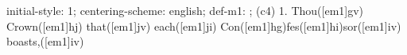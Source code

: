 initial-style: 1;
centering-scheme: english;
def-m1: \grealign;
(c4) 1. Thou([em1]gv) Crown([em1]hj) that([em1]jv) each([em1]ji) Con([em1]hg)fes([em1]hi)sor([em1]iv) boasts,([em1]iv)